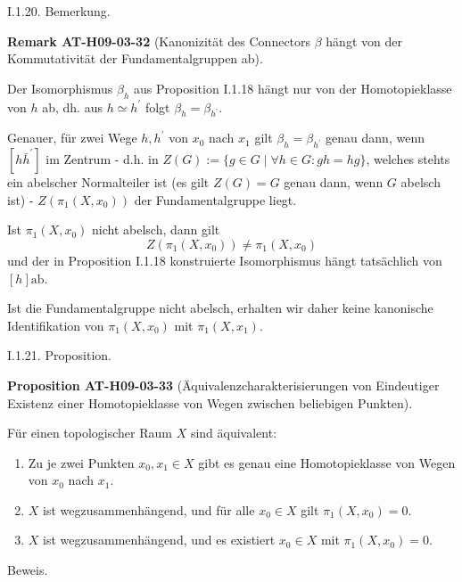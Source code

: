 \documentclass[10pt, letterpaper]{article}
\newcommand{\CustomHeading}[3]{%
  \par\medskip\noindent%
  \textbf{#1 #2} \textnormal{(#3)}.\enskip%
}
\newenvironment{PROP}[2]{\begin{unitbox}\CustomHeading{Proposition}{#1}{#2}}{\end{unitbox}}
\newenvironment{REM}[2]{\begin{unitbox}\CustomHeading{Remark}{#1}{#2}}{\end{unitbox}}
\begin{document}
I.1.20. Bemerkung. 

\begin{REM}{AT-H09-03-32}{Kanonizität des Connectors $\beta$ hängt von der Kommutativität der Fundamentalgruppen ab}
Der Isomorphismus $\beta_{h}$ aus Proposition I.1.18 hängt nur von der Homotopieklasse von $h$ ab, dh. aus $h \simeq h^{\prime}$ folgt $\beta_{h}=\beta_{h^{\prime}}$. 

Genauer, für zwei Wege $h, h^{\prime}$ von $x_{0}$ nach $x_{1}$ gilt $\beta_{h}=\beta_{h^{\prime}}$ genau dann, wenn $\left[h \bar{h}^{\prime}\right]$ im Zentrum - d.h. in $Z(G):=\{g \in G \mid \forall h \in G: g h=h g\}$, welches stehts ein abelscher Normalteiler ist (es gilt $Z(G)=G$ genau dann, wenn $G$ abelsch ist) - $Z\left(\pi_{1}\left(X, x_{0}\right)\right)$ der Fundamentalgruppe liegt. 

Ist $\pi_{1}\left(X, x_{0}\right)$ nicht abelsch, dann gilt 
$$Z\left(\pi_{1}\left(X, x_{0}\right)\right) \neq \pi_{1}\left(X, x_{0}\right)$$
und der in Proposition I.1.18 konstruierte Isomorphismus hängt tatsächlich von $[h] \mathrm{ab}$. 

Ist die Fundamentalgruppe nicht abelsch, erhalten wir daher keine kanonische Identifikation von $\pi_{1}\left(X, x_{0}\right)$ mit $\pi_{1}\left(X, x_{1}\right)$.
\end{REM}


I.1.21. Proposition. 

\begin{PROP}{AT-H09-03-33}{Äquivalenzcharakterisierungen von Eindeutiger Existenz einer Homotopieklasse von Wegen zwischen beliebigen Punkten}
Für einen topologischer Raum $X$ sind äquivalent:
\begin{enumerate}
\item Zu je zwei Punkten $x_{0}, x_{1} \in X$ gibt es genau eine Homotopieklasse von Wegen von $x_{0}$ nach $x_{1}$.
\item $X$ ist wegzusammenhängend, und für alle $x_{0} \in X$ gilt $\pi_{1}\left(X, x_{0}\right)=0$.
\item $X$ ist wegzusammenhängend, und es existiert $x_{0} \in X$ mit $\pi_{1}\left(X, x_{0}\right)=0$.
\end{enumerate}
\end{PROP}


Beweis. 
\end{document}
